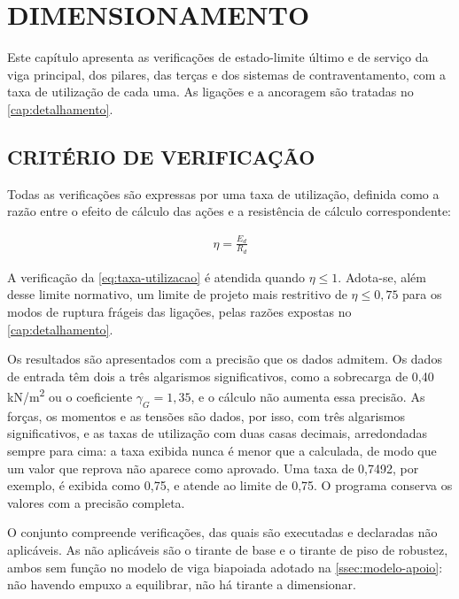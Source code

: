 
\chapter{DIMENSIONAMENTO}\label{cap:dimensionamento}

Este capítulo apresenta as verificações de estado-limite último e de serviço da
viga principal, dos pilares, das terças e dos sistemas de contraventamento, com a
taxa de utilização de cada uma. As ligações e a ancoragem são tratadas no
\autoref{cap:detalhamento}.

\section{CRITÉRIO DE VERIFICAÇÃO}\label{sec:criterio-verificacao}

Todas as verificações são expressas por uma taxa de utilização, definida como a
razão entre o efeito de cálculo das ações e a resistência de cálculo
correspondente:

\begin{align}
    \eta = \frac{E_d}{R_d} \label{eq:taxa-utilizacao}
\end{align}

\noindent
A verificação da \autoref{eq:taxa-utilizacao} é atendida quando $\eta \leq 1$. Adota-se, além desse limite
normativo, um limite de projeto mais restritivo de $\eta \leq 0{,}75$ para os
modos de ruptura frágeis das ligações, pelas razões expostas no
\autoref{cap:detalhamento}.

Os resultados são apresentados com a precisão que os dados admitem. Os dados de
entrada têm dois a três algarismos significativos, como a sobrecarga de
0,40 kN/m\textsuperscript{2} ou o coeficiente $\gamma_G = 1{,}35$, e o cálculo não
aumenta essa precisão. As forças, os momentos e as tensões são dados, por isso,
com três algarismos significativos, e as taxas de utilização com duas casas
decimais, arredondadas sempre para cima: a taxa exibida nunca é menor que a
calculada, de modo que um valor que reprova não aparece como aprovado. Uma
taxa de 0,7492, por exemplo, é exibida como 0,75, e atende ao limite de 0,75. O
programa conserva os valores com a precisão completa.

O conjunto compreende \nVerifExt{} verificações, das quais
\nVerifExecExt{} são executadas e \nVerifNAExt{} declaradas não aplicáveis. As não aplicáveis são o tirante de
base e o tirante de piso de robustez, ambos sem função no modelo de viga
biapoiada adotado na \autoref{ssec:modelo-apoio}: não havendo empuxo a
equilibrar, não há tirante a dimensionar.

